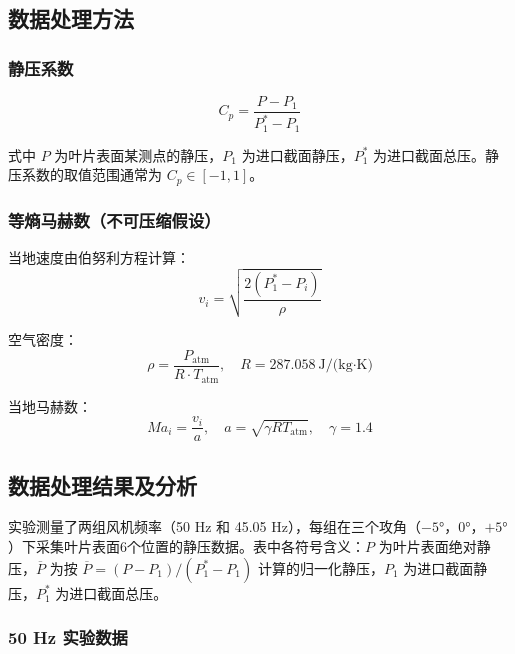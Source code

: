 \subsection{数据处理方法}

\subsubsection{静压系数}

\begin{equation}
    C_p = \frac{P - P_1}{P_1^* - P_1}
\end{equation}

式中 $P$ 为叶片表面某测点的静压，$P_1$ 为进口截面静压，$P_1^*$ 为进口截面总压。静压系数的取值范围通常为 $C_p \in [-1, 1]$。

\subsubsection{等熵马赫数（不可压缩假设）}

当地速度由伯努利方程计算：
\begin{equation}
    v_i = \sqrt{\frac{2(P_1^* - P_i)}{\rho}}
\end{equation}

空气密度：
\begin{equation}
    \rho = \frac{P_{\text{atm}}}{R \cdot T_{\text{atm}}}, \quad R = 287.058\ \text{J/(kg·K)}
\end{equation}

当地马赫数：
\begin{equation}
    Ma_i = \frac{v_i}{a}, \quad a = \sqrt{\gamma R T_{\text{atm}}}, \quad \gamma = 1.4
\end{equation}

\subsection{数据处理结果及分析}

实验测量了两组风机频率（50 Hz 和 45.05 Hz），每组在三个攻角（$-5°$，$0°$，$+5°$）下采集叶片表面6个位置的静压数据。表中各符号含义：$P$ 为叶片表面绝对静压，$\overline{P}$ 为按 $\overline{P} = (P-P_1)/(P_1^*-P_1)$ 计算的归一化静压，$P_1$ 为进口截面静压，$P_1^*$ 为进口截面总压。

\subsubsection{50 Hz 实验数据}





